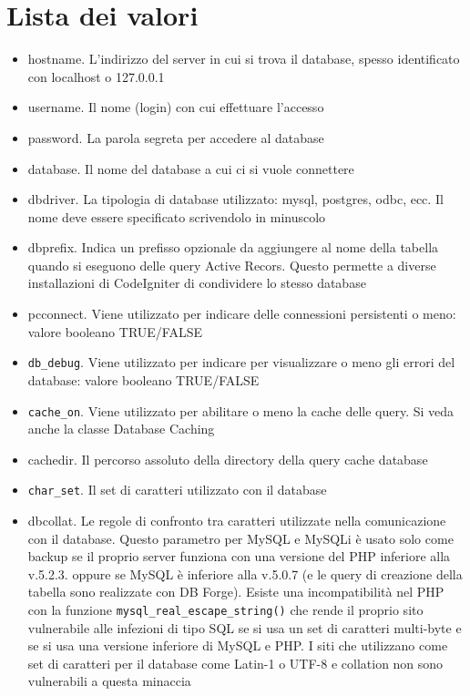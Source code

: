 \section*{Lista dei valori}
\begin{itemize}
\item hostname. L'indirizzo del server in cui si trova il database, spesso identificato con localhost o 127.0.0.1
\item username. Il nome (login) con cui effettuare l'accesso
\item password. La parola segreta per accedere al database
\item database. Il nome del database a cui ci si vuole connettere
\item dbdriver. La tipologia di database utilizzato: mysql, postgres, odbc, ecc. Il nome deve essere specificato scrivendolo in minuscolo
\item dbprefix. Indica un prefisso opzionale da aggiungere al nome della tabella quando si eseguono delle query Active Recors. Questo permette a diverse installazioni di CodeIgniter di condividere lo stesso database
\item pcconnect. Viene utilizzato per indicare delle connessioni persistenti o meno: valore booleano TRUE/FALSE
\item \verb|db_debug|. Viene utilizzato per indicare per visualizzare o meno gli errori del database: valore booleano TRUE/FALSE
\item \verb|cache_on|. Viene utilizzato per abilitare o meno la cache delle query. Si veda anche la classe Database Caching
\item cachedir. Il percorso assoluto della directory della query cache database
\item \verb|char_set|. Il set di caratteri utilizzato con il database
\item dbcollat. Le regole di confronto tra caratteri utilizzate nella comunicazione con il database. Questo parametro per MySQL e MySQLi è usato solo come backup se il proprio server funziona con una versione del PHP inferiore alla v.5.2.3. oppure se MySQL è inferiore alla v.5.0.7 (e le query di creazione della tabella sono realizzate con DB Forge). Esiste una incompatibilità nel PHP con la funzione \verb|mysql_real_escape_string()| che rende il proprio sito vulnerabile alle infezioni di tipo SQL se si usa un set di caratteri multi-byte e se si usa una versione inferiore di MySQL e PHP. I siti che utilizzano come set di caratteri per il database come Latin-1 o UTF-8 e collation non sono vulnerabili a questa minaccia

\end{itemize}
